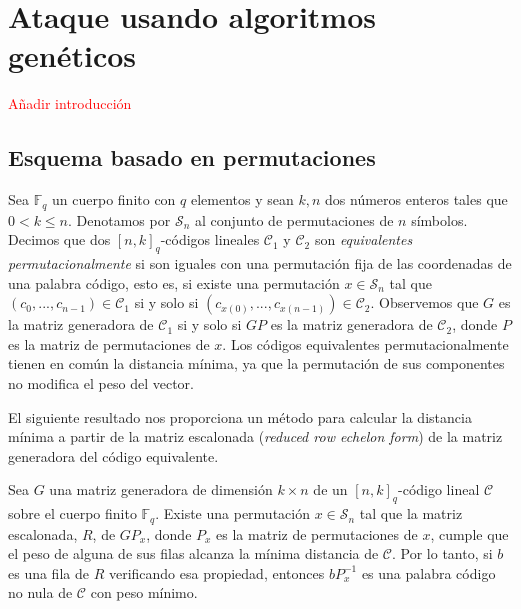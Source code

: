 
\chapter{Ataque usando algoritmos genéticos}


\textcolor{red}{Añadir introducción }

\cite{Cuellar_etal}

\section{Esquema basado en permutaciones}

Sea $\mathbb{F}_q$ un cuerpo finito con $q$ elementos y sean $k,n$ dos números enteros tales que $0 < k \leq n$. Denotamos por $\mathcal{S}_n$ al conjunto de permutaciones de $n$ símbolos. Decimos que dos $[n, k]_q$-códigos lineales $\mathcal{C}_1$ y $\mathcal{C}_2$ son \emph{equivalentes permutacionalmente} si son iguales con una permutación fija de las coordenadas de una palabra código, esto es, si existe una permutación $x \in \mathcal{S}_n$ tal que $(c_0, ..., c_{n-1}) \in \mathcal{C}_1$ si y solo si $(c_{x(0)}, ..., c_{x(n-1)}) \in \mathcal{C}_2$. Observemos que $G$ es la matriz generadora de $\mathcal{C}_1$ si y solo si $GP$ es la matriz generadora de $\mathcal{C}_2$, donde $P$ es la matriz de permutaciones de $x$. Los códigos equivalentes permutacionalmente tienen en común la distancia mínima, ya que la permutación de sus componentes no modifica el peso del vector.

El siguiente resultado nos proporciona un método para calcular la distancia mínima a partir de la matriz escalonada (\emph{reduced row echelon form}) de la matriz generadora del código equivalente.

\begin{theorem}
    Sea $G$ una matriz generadora de dimensión $k \times n$ de un $[n, k]_q$-código lineal $\mathcal{C}$ sobre el cuerpo finito $\mathbb{F}_q$. Existe una permutación $x \in \mathcal{S}_n$ tal que la matriz escalonada, $R$, de $GP_x$, donde $P_x$ es la matriz de permutaciones de $x$, cumple que el peso de alguna de sus filas alcanza la mínima distancia de $\mathcal{C}$. Por lo tanto, si $b$ es una fila de $R$ verificando esa propiedad, entonces $bP_x^{-1}$ es una palabra código no nula de $\mathcal{C}$ con peso mínimo.
\end{theorem}

